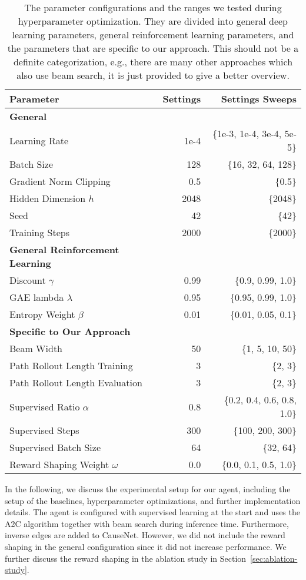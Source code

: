 \begin{table}
\centering
\caption{The parameter configurations and the ranges we tested during hyperparameter optimization.
		 They are divided into general deep learning parameters, general reinforcement learning parameters,
		 and the parameters that are specific to our approach. This should not be a definite categorization, e.g., there are many 
		 other approaches which also use beam search, it is just provided to give a better overview.
		 }
\label{table-parameters}
\begin{tabular}{lrr} 
			\toprule
			\textbf{Parameter} & \textbf{Settings} & \textbf{Settings Sweeps}\\
			\midrule
			\textbf{General} & \\
			Learning Rate & 1e-4 & \{1e-3, 1e-4, 3e-4, 5e-5\}  \\ 
			Batch Size &  128  & \{16, 32, 64, 128\} \\
			Gradient Norm Clipping &  0.5 & \{0.5\}\\
			Hidden Dimension $h$ &  2048 & \{2048\}\\
			Seed &  42 & \{42\} \\
			Training Steps & 2000 & \{2000\}  \\ 
			\midrule
			\textbf{General Reinforcement Learning} & \\
			Discount $\gamma$ & 0.99 & \{0.9, 0.99, 1.0\}  \\
			GAE lambda $\lambda$ & 0.95 & \{0.95, 0.99, 1.0\} \\
			Entropy Weight $\beta$ & 0.01 & \{0.01, 0.05, 0.1\} \\
			\midrule
			\textbf{Specific to Our Approach} & \\
			Beam Width & 50 & \{1, 5, 10, 50\} \\
			Path Rollout Length Training & 3 & \{2, 3\} \\
			Path Rollout Length Evaluation & 3 & \{2, 3\} \\
			Supervised Ratio $\alpha$ & 0.8 & \{0.2, 0.4, 0.6, 0.8, 1.0\}  \\
			Supervised Steps & 300 & \{100, 200, 300\}  \\
			Supervised Batch Size & 64  & \{32, 64\} \\
			Reward Shaping Weight $\omega$ & 0.0 & \{0.0, 0.1, 0.5, 1.0\}  \\
			\bottomrule
\end{tabular}
\end{table}
In the following, we discuss the experimental setup for our agent, including the setup 
of the baselines, hyperparameter optimizations, and further implementation details.
The agent is configured with supervised learning at the start and uses the A2C 
algorithm together with beam search during inference time. Furthermore, inverse edges are 
added to CauseNet.
However, we did not include the reward shaping in the general configuration since 
it did not increase performance.
We further discuss the reward shaping in the ablation study in Section~\ref{sec:ablation-study}.

